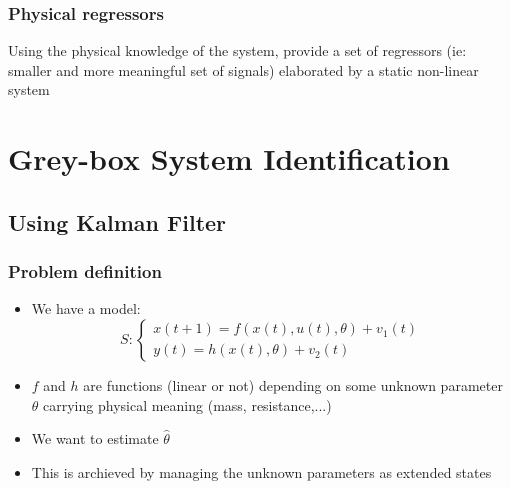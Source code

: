 \documentclass{report}
\begin{document}
\subsection{Physical regressors}
Using the physical knowledge of the system, provide a set of regressors (ie: smaller and more meaningful set of signals) elaborated by a static non-linear system
\begin{center}
\end{center}

\chapter{Grey-box System Identification}
\section{Using Kalman Filter}
\subsection{Problem definition}
\begin{itemize}
\item We have a model:
\[
S:
\begin{cases}
x(t+1)=f(x(t),u(t),\theta)+v_1(t)\\
y(t)=h(x(t),\theta)+v_2(t)
\end{cases}
\]
\item $f$ and $h$ are functions (linear or not) depending on some unknown parameter $\theta$ carrying physical meaning (mass, resistance,...)
\item We want to estimate $\hat{\theta}$
\item This is archieved by managing the unknown parameters as extended states
\end{itemize}
\end{document}
